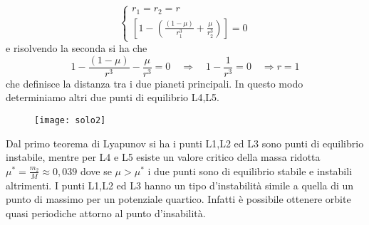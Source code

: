 \begin{equation}
\left\{\begin{array}{l}
r_1 = r_2 =r \\
\left[1-\left(\frac{(1-\mu)}{r_1^3}+\frac{\mu}{r_2^3}\right)\right]=0
\end{array}\right.
\end{equation}
e risolvendo la seconda si ha che 
\begin{equation*}
	1-\frac{(1-\mu)}{r^3}-\frac{\mu}{r^3}=0 \quad \Rightarrow \quad 1-\frac{1}{r^3} = 0 \quad \Rightarrow r =1
\end{equation*}
che definisce la distanza tra i due pianeti principali. In questo modo determiniamo altri due punti di equilibrio L4,L5.
 
\begin{figure}[ht]
\vspace{0.1in}
\texttt{[image: solo2]}	
\centering
\vspace{0.1in}
\end{figure}
Dal primo teorema di Lyapunov si ha i punti L1,L2 ed L3 sono punti di equilibrio instabile, mentre per L4 e L5 esiste un valore critico della massa ridotta $\mu^{*} = \frac{m_2}{M} \approx 0,039$ dove se $\mu > \mu^{*}$ i due punti sono di equilibrio stabile e instabili altrimenti. I punti L1,L2 ed L3 hanno un tipo d'instabilit\`{a} simile a quella di un punto di massimo per un potenziale quartico. Infatti \`{e} possibile ottenere orbite quasi periodiche attorno al punto d'insabilit\`{a}.


